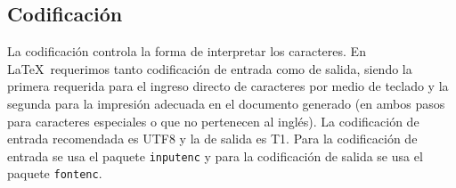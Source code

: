 \documentclass[12pt]{article}
\begin{document}
\subsection{Codificación}

La codificación controla la forma de interpretar los caracteres. En \LaTeX \ requerimos tanto codificación de entrada como de salida, siendo la primera requerida para el ingreso directo de caracteres por medio de teclado y la segunda para la impresión adecuada en el documento generado (en ambos pasos para caracteres especiales o que no pertenecen al inglés). La codificación de entrada recomendada es UTF8 y la de salida es T1. Para la codificación de entrada se usa el paquete \verb-inputenc- y para la codificación de salida se usa el paquete \verb-fontenc-.
 
%
\end{document}
